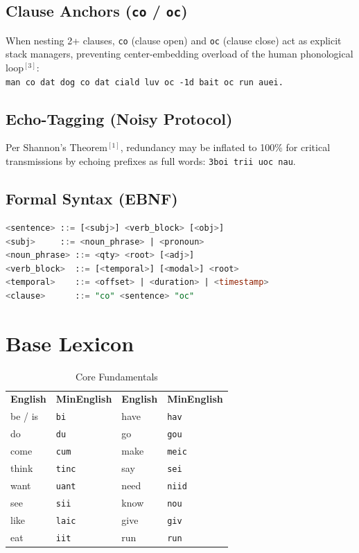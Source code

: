 \documentclass[12pt,onecolumn,letterpaper]{article}
\newcommand{\me}[1]{\texttt{#1}}
\newcommand{\MEtablelayout}{%
\footnotesize
\setlength{\tabcolsep}{6pt}%
\renewcommand{\arraystretch}{1.12}%
\arrayrulecolor{MERule}%
}
\begin{document}
\subsection{Clause Anchors (\me{co} / \me{oc})}
When nesting 2+ clauses, \me{co} (clause open) and \me{oc} (clause close)
act as explicit stack managers, preventing center-embedding overload of
the human phonological loop$^{[3]}$:\\
\me{man co dat dog co dat ciald luv oc -1d bait oc run auei.}

\subsection{Echo-Tagging (Noisy Protocol)}
Per Shannon's Theorem$^{[1]}$, redundancy may be inflated to 100\% for
critical transmissions by echoing prefixes as full words: \me{3boi trii uoc nau}.

\subsection{Formal Syntax (EBNF)}

\begin{lstlisting}[language=SQL]
<sentence> ::= [<subj>] <verb_block> [<obj>]
<subj>     ::= <noun_phrase> | <pronoun>
<noun_phrase> ::= <qty> <root> [<adj>]
<verb_block>  ::= [<temporal>] [<modal>] <root>
<temporal>    ::= <offset> | <duration> | <timestamp>
<clause>      ::= "co" <sentence> "oc"
\end{lstlisting}

\section{Base Lexicon}

\begin{table}[h!]
\centering
\MEtablelayout
\begin{tabularx}{\linewidth}{lXlX}
\rowcolor{MEGray}
\textbf{English} & \textbf{MinEnglish} & \textbf{English} & \textbf{MinEnglish} \\
be / is     & \me{bi}   & have       & \me{hav}   \\
do          & \me{du}   & go         & \me{gou}   \\
come        & \me{cum}  & make       & \me{meic}  \\
think       & \me{tinc} & say        & \me{sei}   \\
want        & \me{uant} & need       & \me{niid}  \\
see         & \me{sii}  & know       & \me{nou}   \\
like        & \me{laic} & give       & \me{giv}   \\
eat         & \me{iit}  & run        & \me{run}   \\
\bottomrule
\end{tabularx}
\caption{Core Fundamentals}
\end{table}
\end{document}
